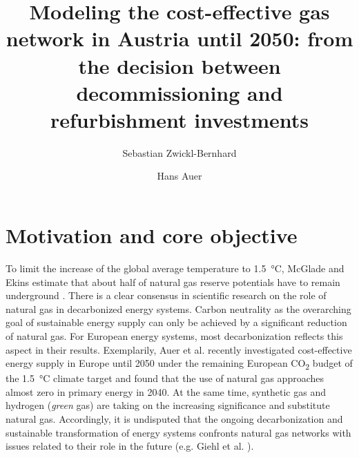 \documentclass[review]{elsarticle}
\begin{document}
\begin{frontmatter}

\title{Modeling the cost-effective gas network in Austria until 2050: from the decision between decommissioning and refurbishment investments}
\author[1]{Sebastian Zwickl-Bernhard}
\author[1]{Hans Auer}
\address[1]{Energy Economics Group (EEG), Technische Universität Wien, Gusshausstrasse 25-29/E370-3, 1040 Wien, Austria}

\end{frontmatter}

\section{Motivation and core objective}
To limit the increase of the global average temperature to \SI{1.5}{\degreeCelsius}, McGlade and Ekins estimate that about half of natural gas reserve potentials have to remain underground \cite{mcglade2015geographical}. There is a clear consensus in scientific research on the role of natural gas in decarbonized energy systems. Carbon neutrality as the overarching goal of sustainable energy supply can only be achieved by a significant reduction of natural gas. For European energy systems, most decarbonization reflects this aspect in their results. Exemplarily, Auer et al. \cite{auer2020development} recently investigated cost-effective energy supply in Europe until 2050 under the remaining European CO\textsubscript{2} budget of the \SI{1.5}{\degreeCelsius} climate target and found that the use of natural gas approaches almost zero in primary energy in 2040. At the same time, synthetic gas and hydrogen (\textit{green} gas) are taking on the increasing significance and substitute natural gas. Accordingly, it is undisputed that the ongoing decarbonization and sustainable transformation of energy systems confronts natural gas networks with issues related to their role in the future (e.g. Giehl et al. \cite{giehl2021modelling}).\vspace{0.3cm}  
\end{document}
